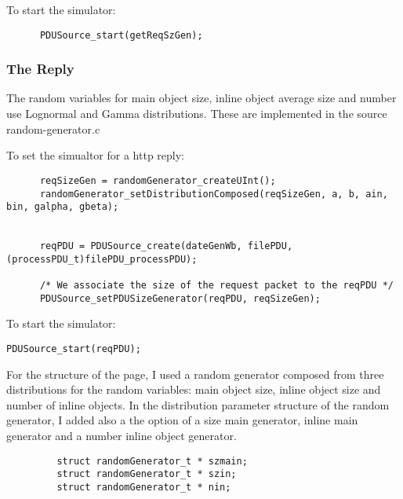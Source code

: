  To start the simulator:
\begin{verbatim}
      PDUSource_start(getReqSzGen);
\end{verbatim}

\subsubsection{The Reply} 

The random variables for main object size, inline object average size and number use Lognormal and Gamma distributions.
 These are implemented in the source random-generator.c

To set the simualtor for a http reply:

\begin{verbatim}
      reqSizeGen = randomGenerator_createUInt();
      randomGenerator_setDistributionComposed(reqSizeGen, a, b, ain, bin, galpha, gbeta);
      
 
      reqPDU = PDUSource_create(dateGenWb, filePDU, (processPDU_t)filePDU_processPDU);  
  
      /* We associate the size of the request packet to the reqPDU */
      PDUSource_setPDUSizeGenerator(reqPDU, reqSizeGen);
\end{verbatim}

 To start the simulator:
\begin{verbatim}
PDUSource_start(reqPDU);
\end{verbatim}
 
  For the structure of the page, I used a random generator composed from three distributions for the random variables: main object size, inline object size and number of inline objects.
  In the distribution parameter structure of the random generator, I added also a the option of a size main generator, inline main generator and a number inline object generator.

\begin{verbatim}
         struct randomGenerator_t * szmain;
         struct randomGenerator_t * szin;
         struct randomGenerator_t * nin;
\end{verbatim} 



